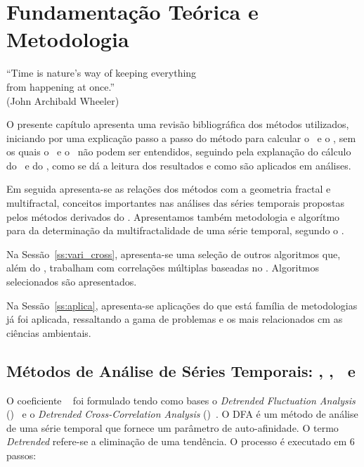 \chapter{Fundamentação Teórica e Metodologia}
\label{cap:fund_teorica}

\begin{flushright}
  ``Time is nature's way of keeping everything\\
  from happening at once.''\\
  (John Archibald Wheeler)
\end{flushright}

O presente capítulo apresenta uma revisão bibliográfica dos métodos utilizados, iniciando por uma explicação passo a passo do método para calcular o \dfa~e o \dcca, sem os quais o \pdcca~e o \dmc~não podem ser entendidos, seguindo pela explanação do cálculo do \pdcca~e do \dmc, como se dá a leitura dos resultados e como são aplicados em análises.

Em seguida apresenta-se as relações dos métodos com a geometria fractal e multifractal, conceitos importantes nas análises das séries temporais propostas pelos métodos derivados do \dfa. Apresentamos também metodologia e algorítmo para da determinação da multifractalidade de uma série temporal, segundo o \dfa.

Na Sessão~\ref{ss:vari_cross}, apresenta-se uma seleção de outros algoritmos que, além do \dmc, trabalham com correlações múltiplas baseadas no \dfa. Algoritmos selecionados são apresentados.

Na Sessão~\ref{ss:aplica}, apresenta-se aplicações do que está família de metodologias já foi aplicada, ressaltando a gama de problemas e os mais relacionados cm as ciências ambientais.

\section{Métodos de Análise de Séries Temporais: \dfa, \dcca, \pdcca~e \dmc}
\label{sec:dmc}

O coeficiente \pdcca~\cite{Zebende2011} foi formulado tendo como bases o \emph{Detrended Fluctuation Analysis} (\dfa)~\cite{Peng_1994} e o \emph{Detrended Cross-Correlation Analysis} (\dcca)~\cite{Podobnik2008}. O DFA é um método de análise de uma série temporal que fornece um parâmetro de auto-afinidade. O termo \emph{Detrended} refere-se a eliminação de uma tendência. O processo é executado em 6 passos:

